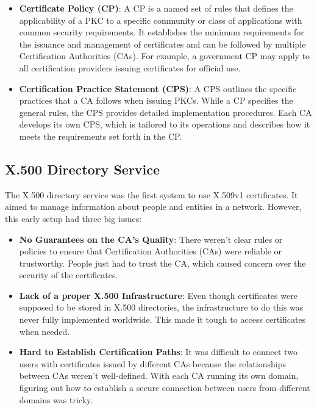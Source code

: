 \begin{itemize}
  \item \textbf{Certificate Policy (CP)}: A CP is a named set of rules
    that defines the applicability of a PKC to a specific community
    or class of applications with common security requirements. It
    establishes the minimum requirements for the issuance and
    management of certificates and can be followed by multiple
    Certification Authorities (CAs). For example, a government CP
    may apply to all certification providers issuing certificates
    for official use.

  \item \textbf{Certification Practice Statement (CPS)}: A CPS outlines
    the specific practices that a CA follows when issuing PKCs.
    While a CP specifies the general rules, the CPS provides
    detailed implementation procedures. Each CA develops its own
    CPS, which is tailored to its operations and describes how it
    meets the requirements set forth in the CP.
\end{itemize}

\subsection{X.500 Directory Service}

The X.500 directory service was the first system to use X.509v1
certificates. It aimed to manage information about people and entities
in a network. However, this early setup had three big issues:

\begin{itemize}
  \item \textbf{No Guarantees on the CA's Quality}: There weren't
    clear rules or policies to ensure that Certification Authorities
    (CAs) were reliable or trustworthy. People just had to trust the
    CA, which caused concern over the security of the certificates.

  \item \textbf{Lack of a proper X.500 Infrastructure}: Even though
    certificates were supposed to be stored in X.500 directories, the
    infrastructure to do this was never fully implemented worldwide.
    This made it tough to access certificates when needed.

  \item \textbf{Hard to Establish Certification Paths}: It was
    difficult to connect two users with certificates issued by
    different CAs because the relationships between CAs weren’t
    well-defined. With each CA running its own domain, figuring out
    how to establish a secure connection between users from different
    domains was tricky.
\end{itemize}

